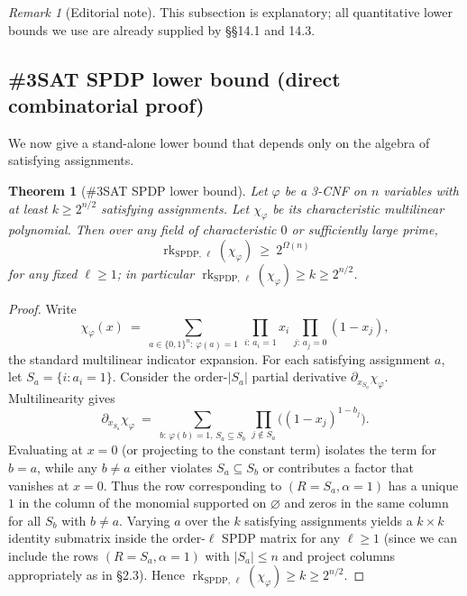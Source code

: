 \documentclass[12pt]{article}
\newtheorem{theorem}{Theorem}
\theoremstyle{definition}
\theoremstyle{definition}
\theoremstyle{remark}
\newtheorem{remark}{Remark}
\theoremstyle{remark}
\begin{document}
\begin{remark}[Editorial note]
This subsection is explanatory; all quantitative lower bounds we use are already supplied by \S\S14.1 and 14.3.
\end{remark}

\subsection{\#3SAT SPDP lower bound (direct combinatorial proof)}

We now give a stand-alone lower bound that depends only on the algebra of satisfying assignments.

\begin{theorem}[\#3SAT SPDP lower bound]\label{thm:3sat-combinatorial-lb}
Let $\varphi$ be a 3-CNF on $n$ variables with at least $k\ge 2^{n/2}$ satisfying assignments. Let $\chi_\varphi$ be its characteristic multilinear polynomial. Then over any field of characteristic $0$ or sufficiently large prime,
\[
\operatorname{rk}_{\mathrm{SPDP},\,\ell}(\chi_\varphi)\ \ge\ 2^{\Omega(n)}
\]
for any fixed $\ell\ge1$; in particular $\operatorname{rk}_{\mathrm{SPDP},\,\ell}(\chi_\varphi)\ge k\ge 2^{n/2}$.
\end{theorem}

\begin{proof}
Write
\[
\chi_\varphi(x)\ =\ \sum_{a\in\{0,1\}^n:\,\varphi(a)=1}\,\prod_{i:\,a_i=1} x_i\,\prod_{j:\,a_j=0}(1-x_j),
\]
the standard multilinear indicator expansion. For each satisfying assignment $a$, let $S_a=\{i:a_i=1\}$. Consider the order-$|S_a|$ partial derivative $\partial_{x_{S_a}}\chi_\varphi$. Multilinearity gives
\[
\partial_{x_{S_a}}\chi_\varphi\ =\ \sum_{b:\,\varphi(b)=1,\,S_a\subseteq S_b}\,\prod_{j\notin S_a}\bigl((1-x_j)^{1-b_j}\bigr).
\]
Evaluating at $x=0$ (or projecting to the constant term) isolates the term for $b=a$, while any $b\neq a$ either violates $S_a\subseteq S_b$ or contributes a factor that vanishes at $x=0$. Thus the row corresponding to $(R=S_a,\alpha=1)$ has a unique $1$ in the column of the monomial supported on $\varnothing$ and zeros in the same column for all $S_b$ with $b\neq a$. Varying $a$ over the $k$ satisfying assignments yields a $k\times k$ identity submatrix inside the order-$\ell$ SPDP matrix for any $\ell\ge1$ (since we can include the rows $(R=S_a,\alpha=1)$ with $|S_a|\le n$ and project columns appropriately as in \S2.3). Hence $\operatorname{rk}_{\mathrm{SPDP},\,\ell}(\chi_\varphi)\ge k\ge 2^{n/2}$.
\end{proof}
\end{document}
